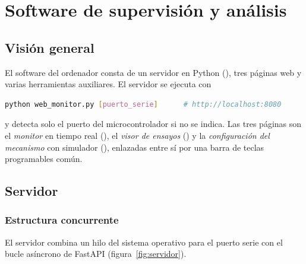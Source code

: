 \chapter{Software de supervisión y análisis}
\label{chap:software}

\section{Visión general}

El software del ordenador consta de un servidor en Python (), tres páginas
web y varias herramientas auxiliares. El servidor se ejecuta con

\begin{lstlisting}[language=bash,numbers=none]
python web_monitor.py [puerto_serie]      # http://localhost:8080
\end{lstlisting}

y detecta solo el puerto del microcontrolador si no se indica. Las tres páginas son el
\emph{monitor} en tiempo real (\codigo{/}), el \emph{visor de ensayos} () y la
\emph{configuración del mecanismo} con simulador (), enlazadas entre sí por una barra
de teclas programables común.

\section{Servidor}

\subsection{Estructura concurrente}

El servidor combina un hilo del sistema operativo para el puerto serie con el bucle asíncrono de
FastAPI (figura~\ref{fig:servidor}).

